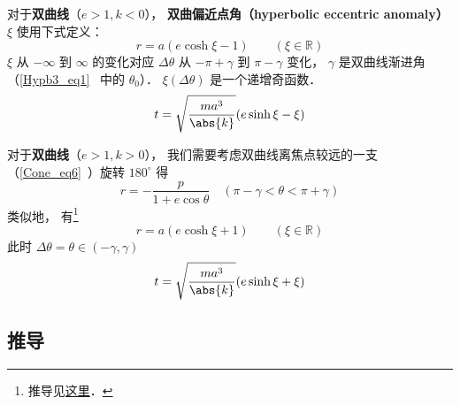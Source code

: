 对于\textbf{双曲线}（$e>1, k<0$）， \textbf{双曲偏近点角（hyperbolic eccentric anomaly）} $\xi$ 使用下式定义：
\begin{equation}\label{EqMoKp_eq2} %
r = a(e\cosh\xi - 1) \qquad (\xi \in \mathbb R)
\end{equation}
$\xi$ 从 $-\infty$ 到 $\infty$ 的变化对应 $\Delta\theta$ 从 $-\pi+\gamma$ 到 $\pi-\gamma$ 变化， $\gamma$ 是双曲线渐进角（\autoref{Hypb3_eq1}~ 中的 $\theta_0$）． $\xi(\Delta\theta)$ 是一个递增奇函数．
\begin{equation}\label{EqMoKp_eq4} %
t = \sqrt{\frac{ma^3}{\abs{k}}} (e\sinh\xi - \xi)
\end{equation}

对于\textbf{双曲线}（$e>1, k>0$）， 我们需要考虑双曲线离焦点较远的一支（\autoref{Cone_eq6}~）旋转 $180^\circ$ 得
\begin{equation} %
r = -\frac{p}{1 + e\cos\theta} \quad (\pi-\gamma<\theta<\pi+\gamma)
\end{equation}
类似地， 有\footnote{推导见\href{https://comethunter.lamost.org/scwrk/THECAL/fkepler.pdf}{这里}．}
\begin{equation} %
r = a(e\cosh\xi + 1) \qquad (\xi \in \mathbb R)
\end{equation}
此时 $\Delta\theta = \theta \in (-\gamma, \gamma)$
\begin{equation}\label{EqMoKp_eq6} %
t = \sqrt{\frac{ma^3}{\abs{k}}} (e\sinh\xi + \xi)
\end{equation}

\subsection{推导}

